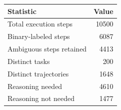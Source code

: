 \begin{tabular}{lr}
\toprule
Statistic & Value \\
\midrule
Total execution steps & 10500 \\
Binary-labeled steps & 6087 \\
Ambiguous steps retained & 4413 \\
Distinct tasks & 200 \\
Distinct trajectories & 1648 \\
Reasoning needed & 4610 \\
Reasoning not needed & 1477 \\
\bottomrule
\end{tabular}
